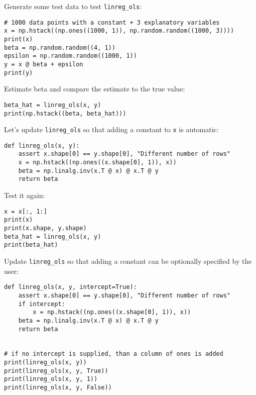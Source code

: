\documentclass[12pt, a4paper]{article}
\begin{document}
Generate some test data to test \texttt{linreg\_ols}:
\lstset{language=jupyter-python,label= ,caption= ,captionpos=b,numbers=none}
\begin{lstlisting}
# 1000 data points with a constant + 3 explanatory variables
x = np.hstack((np.ones((1000, 1)), np.random.random((1000, 3))))
print(x)
beta = np.random.random((4, 1))
epsilon = np.random.random((1000, 1))
y = x @ beta + epsilon
print(y)
\end{lstlisting}

Estimate beta and compare the estimate to the true value:
\lstset{language=jupyter-python,label= ,caption= ,captionpos=b,numbers=none}
\begin{lstlisting}
beta_hat = linreg_ols(x, y)
print(np.hstack((beta, beta_hat)))
\end{lstlisting}

Let's update \texttt{linreg\_ols} so that adding a constant to \texttt{x} is automatic:
\lstset{language=jupyter-python,label= ,caption= ,captionpos=b,numbers=none}
\begin{lstlisting}
def linreg_ols(x, y):
    assert x.shape[0] == y.shape[0], "Different number of rows"
    x = np.hstack((np.ones((x.shape[0], 1)), x))
    beta = np.linalg.inv(x.T @ x) @ x.T @ y
    return beta
\end{lstlisting}

Test it again:
\lstset{language=jupyter-python,label= ,caption= ,captionpos=b,numbers=none}
\begin{lstlisting}
x = x[:, 1:]
print(x)
print(x.shape, y.shape)
beta_hat = linreg_ols(x, y)
print(beta_hat)
\end{lstlisting}

Update \texttt{linreg\_ols} so that adding a constant can be optionally specified by the user:
\lstset{language=jupyter-python,label= ,caption= ,captionpos=b,numbers=none}
\begin{lstlisting}
def linreg_ols(x, y, intercept=True):
    assert x.shape[0] == y.shape[0], "Different number of rows"
    if intercept:
        x = np.hstack((np.ones((x.shape[0], 1)), x))
    beta = np.linalg.inv(x.T @ x) @ x.T @ y
    return beta


# if no intercept is supplied, than a column of ones is added
print(linreg_ols(x, y))
print(linreg_ols(x, y, True))
print(linreg_ols(x, y, 1))
print(linreg_ols(x, y, False))
\end{lstlisting}
\end{document}

